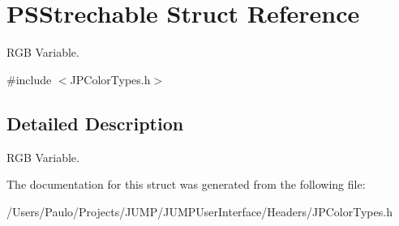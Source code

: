 \hypertarget{struct_p_s_strechable}{
\section{PSStrechable Struct Reference}
\label{struct_p_s_strechable}
}


RGB Variable.  




{\ttfamily \#include $<$JPColorTypes.h$>$}



\subsection{Detailed Description}
RGB Variable. 

The documentation for this struct was generated from the following file:\begin{DoxyCompactItemize}
\item 
/Users/Paulo/Projects/JUMP/JUMPUserInterface/Headers/JPColorTypes.h\end{DoxyCompactItemize}
